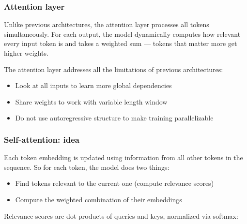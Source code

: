 \documentclass[10pt]{article}
\begin{document}
\subsubsection{Attention layer}

Unlike previous architectures, the attention layer processes all tokens simultaneously.
For each output, the model dynamically computes how relevant every input token is
and takes a weighted sum --- tokens that matter more get higher weights.
\begin{center}
\end{center}

The attention layer addresses all the limitations of previous architectures:
\begin{itemize}
    \item Look at all inputs to learn more global dependencies
    \item Share weights to work with variable length window
    \item Do not use autoregressive structure to make training parallelizable
\end{itemize}

\subsubsection{Self-attention: idea}

Each token embedding is updated using information from all other tokens in the sequence.
So for each token, the model does two things:
\begin{itemize}
    \item Find tokens relevant to the current one (compute relevance scores)
    \item Compute the weighted combination of their embeddings
\end{itemize}

Relevance scores are dot products of queries and keys, normalized via softmax:
\end{document}
